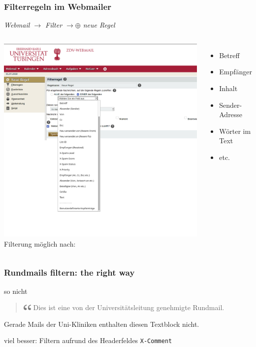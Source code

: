 \documentclass[glossy,aspectratio=169]{beamer}
\begin{document}
	\begin{frame}
	\frametitle{Filterregeln im Webmailer}
	\centering
	\emph{Webmail $\rightarrow$ Filter $\rightarrow \oplus$ neue Regel}\\
	\begin{columns}
		\includegraphics[width=\textwidth]{pictures/filter_dropdown.png}
		\centering
		Filterung möglich nach:
		\begin{itemize}
			\item Betreff
			\item Empfänger
			\item Inhalt
			\item Sender-Adresse
			\item Wörter im Text
			\item etc.
		\end{itemize}
	\end{columns}
	\end{frame}

	\begin{frame}
	\frametitle{Rundmails filtern: the right way}
	\begin{alertblock}{so nicht}
		\begin{quote}
			\includegraphics[width=15px]{pictures/quote.png}
			Dies ist eine von der Universitätsleitung genehmigte Rundmail.
		\end{quote}
	Gerade Mails der Uni-Kliniken enthalten diesen Textblock nicht.
	\end{alertblock}
	\begin{exampleblock}{viel besser:}
		Filtern aufrund des Headerfeldes \texttt{X-Comment}
	\end{exampleblock}
	\end{frame}
\end{document}
